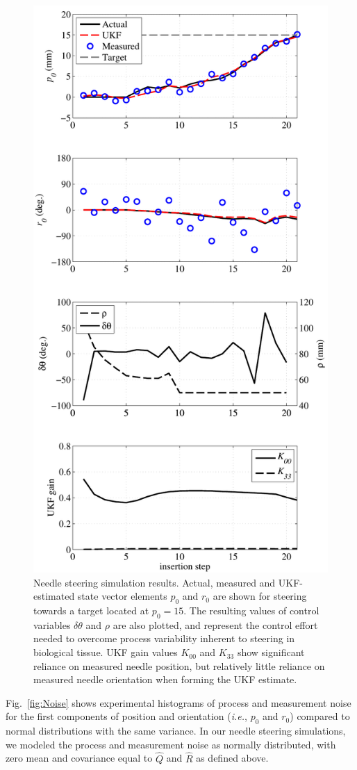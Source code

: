 \begin{figure}[!h]
\centering
\includegraphics[width=0.5\columnwidth]{Images/Chapter4/SimulationResults/SimulationResults}%
\caption[Needle steering simulation results with UKF.]{Needle steering simulation results. Actual, measured and UKF-estimated state vector elements $p_0$ and $r_0$ are shown for steering towards a target located at $p_0 = 15$. The resulting values of control variables $\delta\theta$ and $\rho$ are also plotted, and represent the control effort needed to overcome process variability inherent to steering in biological tissue. UKF gain values $K_{00}$ and $K_{33}$ show significant reliance on measured needle position, but relatively little reliance on measured needle orientation when forming the UKF estimate. }
\label{fig:SimulationResults}
\end{figure}   

Fig.~\ref{fig:Noise} shows experimental histograms of process and measurement noise for the first components of position and orientation (\textit{i.e.}, $p_0$ and $r_0$) compared to normal distributions with the same variance. In our needle steering simulations, we modeled the process and measurement noise as normally distributed, with zero mean and covariance equal to ${\hat{Q}}$ and ${\hat{R}}$ as defined above.

